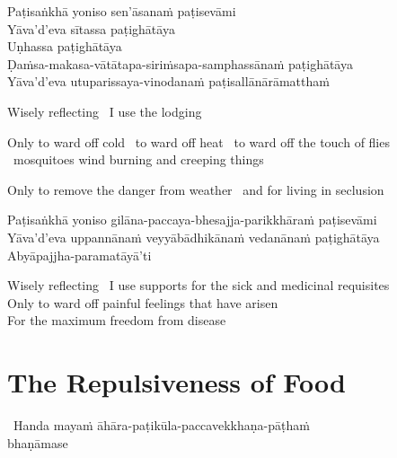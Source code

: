 Paṭisaṅkhā yoniso sen'āsanaṁ paṭisevāmi\\
Yāva'd'eva sītassa paṭighātāya\\
Uṇhassa paṭighātāya\\
Ḍaṁsa-makasa-vātātapa-siriṁsapa-samphassānaṁ paṭighātāya\\
Yāva'd'eva utuparissaya-vinodanaṁ paṭisallānārāmatthaṁ

\begin{english-keepwith}
  Wisely reflecting \breathmark\ I use the lodging
  \begin{english-hangtogether}
    Only to ward off cold \breathmark\ to ward off heat \breathmark\ to ward off the touch of flies \breathmark\ mosquitoes wind burning and creeping things
  \end{english-hangtogether}
  \begin{english-hangtogether}
    Only to remove the danger from weather \breathmark\ and for living in seclusion
  \end{english-hangtogether}
\end{english-keepwith}

Paṭisaṅkhā yoniso gilāna-paccaya-bhesajja-parikkhāraṁ paṭisevāmi\\
Yāva'd'eva uppannānaṁ veyyābādhikānaṁ vedanānaṁ paṭighātāya\\
Abyāpajjha-paramatāyā'ti

\begin{english-verses}
  Wisely reflecting \breathmark\ I use supports for the sick and medicinal requisites\\
  Only to ward off painful feelings that have arisen\\
  For the maximum freedom from disease
\end{english-verses}

\suttaRef{[MN 2]}


\section{The Repulsiveness of Food}
\label{repulsiveness-of-food}

\begin{leader}
  \anglebracketleft\ \hspace{-0.5mm}Handa mayaṁ āhāra-paṭikūla-paccavekkhaṇa-pāṭhaṁ\\ bhaṇāmase \hspace{-0.5mm}\anglebracketright\
\end{leader}

